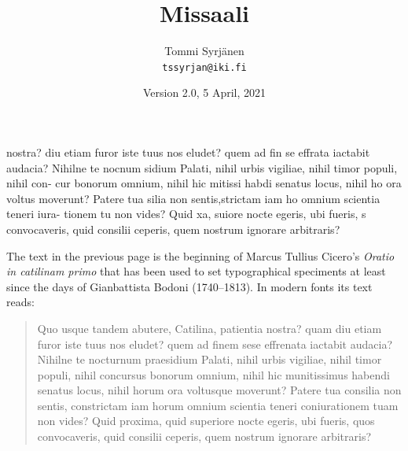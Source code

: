 \documentclass[a4paper, 12pt]{article}
\title{\fontsize{36}{36}\fontspec[BoldFont=Missaali]{Missaali}Missaali}
\author{Tommi Syrjänen \\ \texttt{tssyrjan@iki.fi}}
\date{Version 2.0, 5 April, 2021}
\begin{document}
 \maketitle

\mbox{}

\thispagestyle{empty}

\begin{center}
{
  \begin{mstexturablock}
    \msaltpunctuation%
    nostra?  diu eti{am} furor iste
    tuus nos eludet? qu{em} ad fin
    se effrata iactabit audacia?
    Nihilne te nocnum sidium
    Palati, nihil urbis vigiliae,
    nihil timor populi, nihil con-
    cur bonorum omnium, nihil
    hic mitissi habdi senatus
    locus, nihil ho ora voltus
    moverunt? Patere tua silia 
    non sentis,strictam iam ho 
    omnium scientia teneri iura- 
    tionem tu non vides? Quid
    xa,  suiore nocte egeris,
    ubi fueris, s {con}vocaveris,
    {quid} consilii ceperis, quem 
    nostr{um} ignorare arbitraris? 
  \end{mstexturablock}
}
\end{center}


\newpage

\thispagestyle{empty}

The text in the previous page is the beginning of Marcus Tullius
Cicero's \emph{Oratio in catilinam primo} that has been used to set
typographical speciments at least since the days of Gianbattista Bodoni
(1740–1813). In modern fonts its text reads:

\begin{quote}
  Quo usque tandem abutere, Catilina, patientia nostra? quam diu etiam
  furor iste tuus nos eludet? quem ad finem sese effrenata iactabit
  audacia? Nihilne te nocturnum praesidium Palati, nihil urbis
  vigiliae, nihil timor populi, nihil concursus bonorum omnium, nihil
  hic munitissimus habendi senatus locus, nihil horum ora voltusque
  moverunt? Patere tua consilia non sentis, constrictam iam horum
  omnium scientia teneri coniurationem tuam non vides? Quid proxima,
  quid superiore nocte egeris, ubi fueris, quos convocaveris, quid
  consilii ceperis, quem nostrum ignorare arbitraris?
\end{quote}
\end{document}
